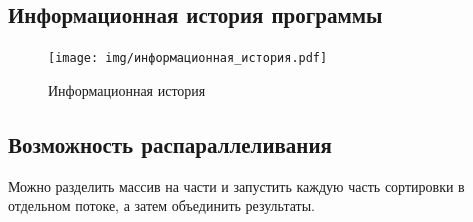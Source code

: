 \subsection{Информационная история программы}

\begin{figure}[h]
	\centering
	\label{fg:ii}
	\texttt{[image: img/информационная\_история.pdf]}
	\caption{Информационная история}
\end{figure}

\clearpage

\subsection{Возможность распараллеливания}
Можно разделить массив на части и запустить каждую часть сортировки в отдельном потоке, а затем объединить результаты.